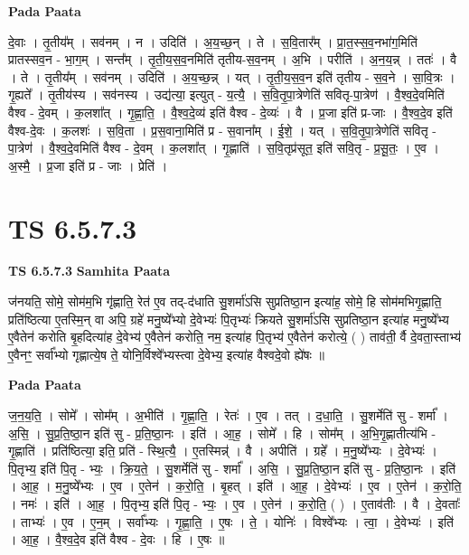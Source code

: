 \documentclass[17pt]{extarticle}
\begin{document}
\textbf{Pada Paata} \newline

दे॒वाः । तृ॒तीय᳚म् । सव॑नम् । न । उदिति॑ । अ॒य॒च्छ॒न् । ते । स॒वि॒तार᳚म् । प्रा॒त॒स्स॒व॒नभा॑ग॒मिति॑ प्रातस्सव॒न - भा॒ग॒म् । सन्त᳚म् । तृ॒ती॒य॒स॒व॒नमिति॑ तृतीय-स॒व॒नम् । अ॒भि । परीति॑ । अ॒न॒य॒न्न् । ततः॑ । वै । ते । तृ॒तीय᳚म् । सव॑नम् । उदिति॑ । अ॒य॒च्छ॒न्न् । यत् । तृ॒ती॒य॒स॒व॒न इति॑ तृतीय - स॒व॒ने । सा॒वि॒त्रः । गृ॒ह्यते᳚ । तृ॒तीय॑स्य । सव॑नस्य । उद्य॑त्या॒ इत्युत् - य॒त्यै॒ । स॒वि॒तृ॒पा॒त्रेणेति॑ सवितृ-पा॒त्रेण॑ । वै॒श्व॒दे॒वमिति॑ वैश्व - दे॒वम् । क॒लशा᳚त् । गृ॒ह्णा॒ति॒ । वै॒श्व॒दे॒व्य॑ इति॑ वैश्व - दे॒व्यः॑ । वै । प्र॒जा इति॑ प्र-जाः । वै॒श्व॒दे॒व इति॑ वैश्व-दे॒वः । क॒लशः॑ । स॒वि॒ता । प्र॒स॒वाना॒मिति॑ प्र - स॒वाना᳚म् । ई॒शे॒ । यत् । स॒वि॒तृ॒पा॒त्रेणेति॑ सवितृ - पा॒त्रेण॑ । वै॒श्व॒दे॒वमिति॑ वैश्व - दे॒वम् । क॒लशा᳚त् । गृ॒ह्णाति॑ । स॒वि॒तृप्र॑सूत॒ इति॑ सवि॒तृ - प्र॒सू॒तः॒ । ए॒व । अ॒स्मै॒ । प्र॒जा इति॑ प्र - जाः । प्रेति॑ ।  \newline




\section*{ TS 6.5.7.3 }

\textbf{TS 6.5.7.3 } \newline
\textbf{Samhita Paata} \newline

ज॑नयति॒ सोमे॒ सोम॑म॒भि गृ॑ह्णाति॒ रेत॑ ए॒व तद्-द॑धाति सु॒शर्मा॑ऽसि सुप्रतिष्ठा॒न इत्या॑ह॒ सोमे॒ हि सोम॑मभिगृ॒ह्णाति॒ प्रति॑ष्ठित्या ए॒तस्मि॒न् वा अपि॒ ग्रहे॑ मनु॒ष्ये᳚भ्यो दे॒वेभ्यः॑ पि॒तृभ्यः॑ क्रियते सु॒शर्मा॑ऽसि सुप्रतिष्ठा॒न इत्या॑ह मनु॒ष्ये᳚भ्य ए॒वैतेन॑ करोति बृ॒हदित्या॑ह दे॒वेभ्य॑ ए॒वैतेन॑ करोति॒ नम॒ इत्या॑ह पि॒तृभ्य॑ ए॒वैतेन॑ करोत्ये॒ ( ) ताव॑ती॒ र्वै दे॒वता॒स्ताभ्य॑ ए॒वैनꣳ॒॒ सर्वा᳚भ्यो गृह्णात्ये॒ष ते॒ योनि॒र्विश्वे᳚भ्यस्त्वा दे॒वेभ्य॒ इत्या॑ह वैश्वदे॒वो ह्ये॑षः ॥ \newline

\textbf{Pada Paata} \newline

ज॒न॒य॒ति॒ । सोमे᳚ । सोम᳚म् । अ॒भीति॑ । गृ॒ह्णा॒ति॒ । रेतः॑ । ए॒व । तत् । द॒धा॒ति॒ । सु॒शर्मेति॑ सु - शर्मा᳚ । अ॒सि॒ । सु॒प्र॒ति॒ष्ठा॒न इति॑ सु - प्र॒ति॒ष्ठा॒नः । इति॑ । आ॒ह॒ । सोमे᳚ । हि । सोम᳚म् । अ॒भि॒गृ॒ह्णातीत्य॑भि - गृ॒ह्णाति॑ । प्रति॑ष्ठित्या॒ इति॒ प्रति॑ - स्थि॒त्यै॒ । ए॒तस्मिन्न्॑ । वै । अपीति॑ । ग्रहे᳚ । म॒नु॒ष्ये᳚भ्यः । दे॒वेभ्यः॑ । पि॒तृभ्य॒ इति॑ पि॒तृ - भ्यः॒ । क्रि॒य॒ते॒ । सु॒शर्मेति॑ सु - शर्मा᳚ । अ॒सि॒ । सु॒प्र॒ति॒ष्ठा॒न इति॑ सु - प्र॒ति॒ष्ठा॒नः । इति॑ । आ॒ह॒ । म॒नु॒ष्ये᳚भ्यः । ए॒व । ए॒तेन॑ । क॒रो॒ति॒ । बृ॒हत् । इति॑ । आ॒ह॒ । दे॒वेभ्यः॑ । ए॒व । ए॒तेन॑ । क॒रो॒ति॒ । नमः॑ । इति॑ । आ॒ह॒ । पि॒तृभ्य॒ इति॑ पि॒तृ - भ्यः॒ । ए॒व । ए॒तेन॑ । क॒रो॒ति॒ ( ) । ए॒ताव॑तीः । वै । दे॒वताः᳚ । ताभ्यः॑ । ए॒व । ए॒न॒म् । सर्वा᳚भ्यः । गृ॒ह्णा॒ति॒ । ए॒षः । ते॒ । योनिः॑ । विश्वे᳚भ्यः । त्वा॒ । दे॒वेभ्यः॑ । इति॑ । आ॒ह॒ । वै॒श्व॒दे॒व इति॑ वैश्व - दे॒वः । हि । ए॒षः ॥  \newline
\end{document}
